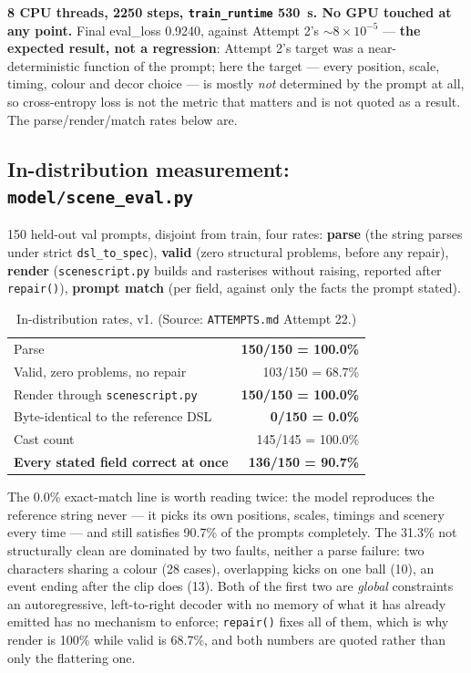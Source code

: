 \documentclass[11pt]{article}
\begin{document}
\textbf{8 CPU threads, 2250 steps, \texttt{train\_runtime} 530~s. No GPU
touched at any point.} Final eval\_loss 0.9240, against Attempt 2's
$\sim8\times10^{-5}$ --- \textbf{the expected result, not a regression}:
Attempt 2's target was a near-deterministic function of the prompt; here
the target --- every position, scale, timing, colour and decor choice ---
is mostly \emph{not} determined by the prompt at all, so cross-entropy
loss is not the metric that matters and is not quoted as a result. The
parse/render/match rates below are.

\subsection{In-distribution measurement: \texttt{model/scene\_eval.py}}
\label{sec:indist-a22}

150 held-out val prompts, disjoint from train, four rates: \textbf{parse}
(the string parses under strict \texttt{dsl\_to\_spec}), \textbf{valid}
(zero structural problems, before any repair), \textbf{render}
(\texttt{scenescript.py} builds and rasterises without raising, reported
after \texttt{repair()}), \textbf{prompt match} (per field, against only
the facts the prompt stated).

\begin{table}[h]
\centering
\caption{In-distribution rates, v1. (Source: \texttt{ATTEMPTS.md} Attempt 22.)}
\label{tab:v1indist}
\begin{tabular}{@{}lr@{}}
\toprule
 & \\
\midrule
Parse & \textbf{150/150 = 100.0\%} \\
Valid, zero problems, no repair & 103/150 = 68.7\% \\
Render through \texttt{scenescript.py} & \textbf{150/150 = 100.0\%} \\
Byte-identical to the reference DSL & \textbf{0/150 = 0.0\%} \\
Cast count & 145/145 = 100.0\% \\
\textbf{Every stated field correct at once} & \textbf{136/150 = 90.7\%} \\
\bottomrule
\end{tabular}
\end{table}

The 0.0\% exact-match line is worth reading twice: the model reproduces
the reference string never --- it picks its own positions, scales,
timings and scenery every time --- and still satisfies 90.7\% of the
prompts completely. The 31.3\% not structurally clean are dominated by
two faults, neither a parse failure: two characters sharing a colour (28
cases), overlapping kicks on one ball (10), an event ending after the
clip does (13). Both of the first two are \emph{global} constraints an
autoregressive, left-to-right decoder with no memory of what it has
already emitted has no mechanism to enforce; \texttt{repair()} fixes all
of them, which is why render is 100\% while valid is 68.7\%, and both
numbers are quoted rather than only the flattering one.
\end{document}

